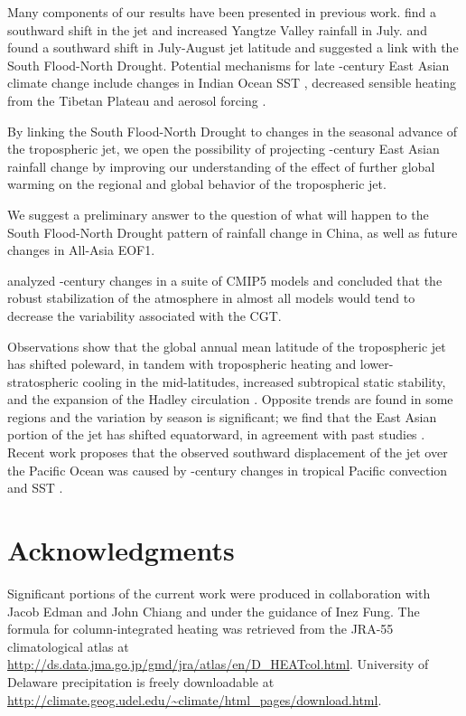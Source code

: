 	Many components of our results have been presented in previous work. \citet{Xuan2011} find a southward shift in the jet and increased Yangtze Valley rainfall in July. \citet{Yu2004} and \citet{Yu2007} found a southward shift in July-August jet latitude and suggested a link with the South Flood-North Drought. Potential mechanisms for late -century East Asian climate change include changes in Indian Ocean SST \citep{Qu2012}, decreased sensible heating from the Tibetan Plateau \citep{Liu2012a,Hu2015} and aerosol forcing \citep{Song2014}.
	
 By linking the South Flood-North Drought to changes in the seasonal advance of the tropospheric jet, we open the possibility of projecting -century East Asian rainfall change by improving our understanding of the effect of further global warming on the regional and global behavior of the tropospheric jet.
	
	
	We suggest a preliminary answer to the question of what will happen to the South Flood-North Drought pattern of rainfall change in China, as well as future changes in All-Asia EOF1.
	
	\citet{Lee2014} analyzed -century changes in a suite of CMIP5 models and concluded that the robust stabilization of the atmosphere in almost all models would tend to decrease the variability associated with the CGT. 
	
		Observations show that the global annual mean latitude of the tropospheric jet has shifted poleward, in tandem with tropospheric heating and lower-stratospheric cooling in the mid-latitudes, increased subtropical static stability, and the expansion of the Hadley circulation \citep{Fu2006,Archer2008,Fu2011}. Opposite trends are found in some regions and the variation by season is significant; we find that the East Asian portion of the jet has shifted equatorward, in agreement with past studies \citep{Yu2007, Archer2008}. Recent work proposes that the observed southward displacement of the jet over the Pacific Ocean was caused by -century changes in tropical Pacific convection and SST \citep{Park2014a}. 

	
\section{Acknowledgments}

	Significant portions of the current work were produced in collaboration with Jacob Edman and John Chiang and under the guidance of Inez Fung. The formula for column-integrated heating was retrieved from the JRA-55 climatological atlas at \url{http://ds.data.jma.go.jp/gmd/jra/atlas/en/D_HEATcol.html}. University of Delaware precipitation is freely downloadable at \url{http://climate.geog.udel.edu/~climate/html_pages/download.html}.



